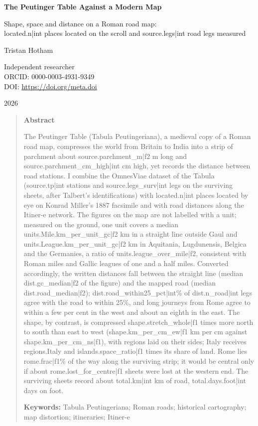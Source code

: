 \documentclass[11pt,a4paper]{article}
\begin{document}
\begin{center}
{\Large\bfseries The Peutinger Table Against a Modern Map\par}
\vspace{0.4em}
{\large Shape, space and distance on a Roman road map:\\{{located.n|int}} places located on the scroll and {{source.legs|int}} road legs measured\par}
\vspace{1.2em}
{\large Tristan Hotham\par}
\vspace{0.3em}
{\small Independent researcher\\
ORCID: 0000-0003-4931-9349\\
DOI: \href{https://doi.org/{{meta.doi}}}{https://doi.org/{{meta.doi}}}\par}
\vspace{0.8em}
2026
\end{center}

\begin{quote}
\small
\begin{center}\textbf{Abstract}\end{center}
The Peutinger Table (Tabula Peutingeriana), a medieval copy of a Roman road map, compresses the world from Britain to India into a strip of parchment about {{source.parchment_m|f2}} m long and {{source.parchment_cm_high|int}} cm high, yet records the distance between road stations. I combine the OmnesViae dataset of the Tabula ({{source.tp|int}} stations and {{source.legs_surv|int}} legs on the surviving sheets, after Talbert's identifications) with {{located.n|int}} places located by eye on Konrad Miller's 1887 facsimile and with road distances along the Itiner-e network. The figures on the map are not labelled with a unit; measured on the ground, one unit covers a median {{units.Mile.km_per_unit_gc|f2}} km in a straight line outside Gaul and {{units.League.km_per_unit_gc|f2}} km in Aquitania, Lugdunensis, Belgica and the Germanies, a ratio of {{units.league_over_mile|f2}}, consistent with Roman miles and Gallic leagues of one and a half miles. Converted accordingly, the written distances fall between the straight line (median {{dist.gc_median|f2}} of the figure) and the mapped road (median {{dist.road_median|f2}}); {{dist.road_within25_pct|int}}\% of {{dist.n_road|int}} legs agree with the road to within 25\%, and long journeys from Rome agree to within a few per cent in the west and about an eighth in the east. The shape, by contrast, is compressed {{shape.stretch_whole|f1}} times more north to south than east to west ({{shape.km_per_cm_ew|f1}} km per cm against {{shape.km_per_cm_ns|f1}}), with regions laid on their sides; Italy receives {{regions.Italy and islands.space_ratio|f1}} times its share of land. Rome lies {{rome.frac|f1}}\% of the way along the surviving strip; it would be central only if about {{rome.lost_for_centre|f1}} sheets were lost at the western end. The surviving sheets record about {{total.km|int}} km of road, {{total.days.foot|int}} days on foot.

\textbf{Keywords:} Tabula Peutingeriana; Roman roads; historical cartography; map distortion; itineraries; Itiner-e
\end{quote}
\end{document}
